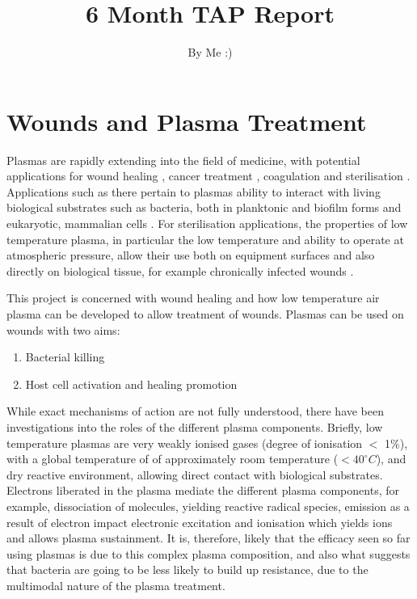 \documentclass[11pt, oneside]{article}   	%
\title{6 Month TAP Report}
\author{By Me :)}
\date{}							%
\begin{document}
\maketitle

\section{Wounds and Plasma Treatment}
Plasmas are rapidly extending into the field of medicine, with potential applications for wound healing \cite{Haertel2014nonthermal, Isbary2013nonthermal}, cancer treatment \cite{Hirst2016low, Fridman2007floating}, coagulation \cite{Fridman2006blood, Chen2009blood} and sterilisation \cite{Fridman2006blood, Laroussi2002nonthermal}.
Applications such as there pertain to plasmas ability to interact with living biological substrates such as bacteria, both in planktonic and biofilm forms \cite{Joshi2010control, Pei2012inactivation, Ziuzina2015cold} and eukaryotic, mammalian cells \cite{Haertel2014nonthermal}.
For sterilisation applications, the properties of low temperature plasma, in particular the low temperature and ability to operate at atmospheric pressure, allow their use both on equipment surfaces \cite{Laroussi2002nonthermal} and also directly on biological tissue, for example chronically infected wounds \cite{Haertel2014nonthermal, Isbary2013nonthermal, Fridman2006blood}.

This project is concerned with wound healing and how low temperature air plasma can be developed to allow treatment of wounds.
Plasmas can be used on wounds with two aims:
\begin{enumerate}
\item Bacterial killing
\item Host cell activation and healing promotion
\end{enumerate}

While exact mechanisms of action are not fully understood, there have been investigations into the roles of the different plasma components.
Briefly, low temperature plasmas are very weakly ionised gases (degree of ionisation $<$ 1\%), with a global temperature of of approximately room temperature ($< 40^{\circ} C$), and dry reactive environment, allowing direct contact with biological substrates.
Electrons liberated in the plasma mediate the different plasma components, for example, dissociation of molecules, yielding reactive radical species, emission as a result of electron impact electronic excitation and ionisation which yields ions and allows plasma sustainment.
It is, therefore, likely that the efficacy seen so far using plasmas is due to this complex plasma composition, and also what suggests that bacteria are going to be less likely to build up resistance, due to the multimodal nature of the plasma treatment.
\end{document}
